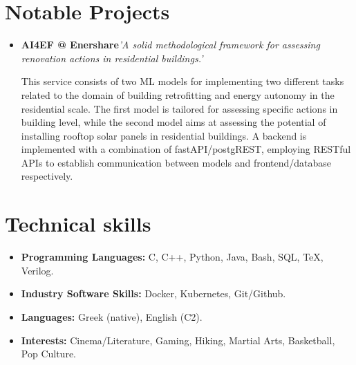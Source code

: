 \documentclass[11pt,a4paper,sans]{moderncv}        %
\begin{document}
\vspace{2pt}

\section{Notable Projects}

\vspace{5pt}

\begin{itemize}

\item{\textbf{AI4EF @ Enershare}\textit{'A solid methodological framework for assessing renovation actions in residential buildings.'}

\vspace{3pt}

\small{
This service consists of two ML models for implementing two different tasks related to the domain of building retrofitting and energy autonomy in the residential scale. The first model is tailored for assessing specific actions in building level, while the second model aims at assessing the potential of installing rooftop solar panels in residential buildings. A backend is implemented with a combination of fastAPI/postgREST, employing RESTful APIs to establish communication between models and frontend/database respectively.}}

\end{itemize}

\section{Technical skills}

\begin{itemize}

\item \textbf{Programming Languages:} C, C++, Python, Java, Bash, SQL, TeX, Verilog.

\vspace{2pt}

\item \textbf{Industry Software Skills:} Docker, Kubernetes, Git/Github.

\vspace{2pt}

\item \textbf{Languages:} Greek (native), English (C2).

\vspace{2pt}

\item \textbf{Interests:} Cinema/Literature, Gaming, Hiking, Martial Arts, Basketball, Pop Culture.


\end{itemize}
\end{document}

